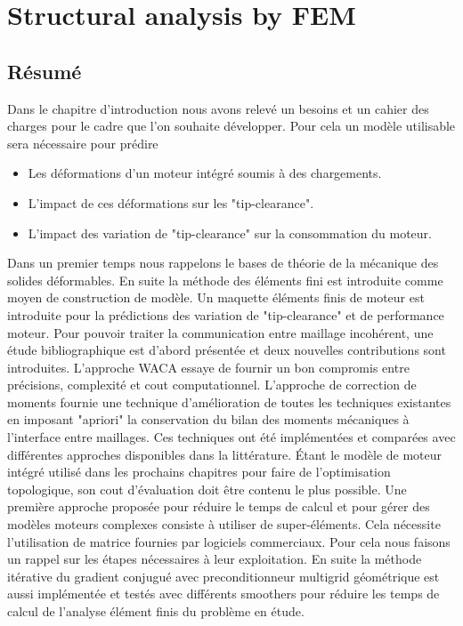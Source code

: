 \chapter{Structural analysis by FEM }
\label{chap:1}
\minitoc
\begin{mdframed}[hidealllines=true,backgroundcolor=lightgray!20]
\section*{Résumé}
Dans le chapitre d'introduction nous avons relevé un besoins et un cahier des charges pour le cadre que l'on souhaite développer. Pour cela un modèle utilisable sera nécessaire pour prédire
\begin{itemize}
\item Les déformations d'un moteur intégré soumis à des chargements.
\item L'impact de ces déformations sur les "tip-clearance".
\item L'impact des variation de "tip-clearance" sur la consommation du moteur.
\end{itemize}
Dans un premier temps nous rappelons le bases de théorie de la mécanique des solides déformables. En suite la méthode des éléments fini est introduite comme moyen de construction de modèle. Un maquette éléments finis de moteur est introduite pour la prédictions des variation de "tip-clearance" et de performance moteur. Pour pouvoir traiter la communication entre maillage incohérent, une étude bibliographique est d'abord présentée et deux nouvelles contributions sont introduites. L'approche WACA essaye de fournir un bon compromis entre précisions, complexité et cout computationnel. L'approche de correction de moments fournie une technique d'amélioration de toutes les techniques existantes en imposant "apriori" la conservation du bilan des moments mécaniques à l'interface entre maillages. Ces techniques ont été implémentées et comparées avec différentes approches disponibles dans la littérature.
Étant le modèle de moteur intégré utilisé dans les prochains chapitres pour faire de l'optimisation topologique, son cout d'évaluation doit être contenu le plus possible. Une première approche proposée pour réduire le temps de calcul et pour gérer des modèles moteurs complexes consiste à utiliser de super-éléments. Cela nécessite l'utilisation de matrice fournies par logiciels commerciaux. Pour cela nous faisons un rappel sur les étapes nécessaires à leur exploitation. En suite la méthode itérative du gradient conjugué avec preconditionneur multigrid géométrique est aussi implémentée et testés avec différents smoothers pour réduire les temps de calcul de l'analyse élément finis du problème en étude. 
\end{mdframed}
